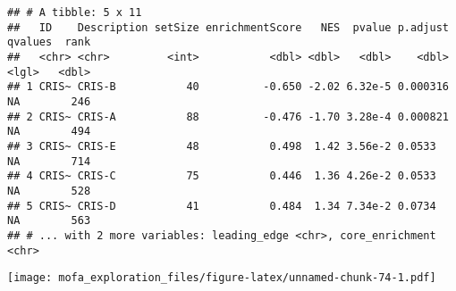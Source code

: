 \documentclass[
]{article}
\newenvironment{Shaded}{\begin{snugshade}}{\end{snugshade}}
\newcommand{\CommentTok}[1]{\textcolor[rgb]{0.56,0.35,0.01}{\textit{#1}}}
\newcommand{\DataTypeTok}[1]{\textcolor[rgb]{0.13,0.29,0.53}{#1}}
\newcommand{\DecValTok}[1]{\textcolor[rgb]{0.00,0.00,0.81}{#1}}
\newcommand{\KeywordTok}[1]{\textcolor[rgb]{0.13,0.29,0.53}{\textbf{#1}}}
\newcommand{\NormalTok}[1]{#1}
\newcommand{\OperatorTok}[1]{\textcolor[rgb]{0.81,0.36,0.00}{\textbf{#1}}}
\newcommand{\StringTok}[1]{\textcolor[rgb]{0.31,0.60,0.02}{#1}}
\begin{document}
\begin{verbatim}
## # A tibble: 5 x 11
##   ID    Description setSize enrichmentScore   NES  pvalue p.adjust qvalues  rank
##   <chr> <chr>         <int>           <dbl> <dbl>   <dbl>    <dbl> <lgl>   <dbl>
## 1 CRIS~ CRIS-B           40          -0.650 -2.02 6.32e-5 0.000316 NA        246
## 2 CRIS~ CRIS-A           88          -0.476 -1.70 3.28e-4 0.000821 NA        494
## 3 CRIS~ CRIS-E           48           0.498  1.42 3.56e-2 0.0533   NA        714
## 4 CRIS~ CRIS-C           75           0.446  1.36 4.26e-2 0.0533   NA        528
## 5 CRIS~ CRIS-D           41           0.484  1.34 7.34e-2 0.0734   NA        563
## # ... with 2 more variables: leading_edge <chr>, core_enrichment <chr>
\end{verbatim}

\begin{Shaded}
\end{Shaded}

\texttt{[image: mofa\_exploration\_files/figure-latex/unnamed-chunk-74-1.pdf]}

\begin{Shaded}
\end{Shaded}
\end{document}
